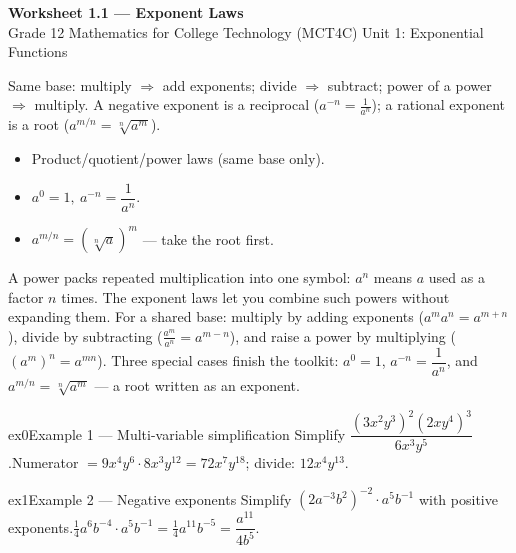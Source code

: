 \documentclass[11pt]{article}
\begin{document}
\begin{center}
{\LARGE\bfseries\color{titleblue}Worksheet 1.1 --- Exponent Laws}\\[2pt]
{\small Grade 12 Mathematics for College Technology (MCT4C) \textperiodcentered{} Unit 1: Exponential Functions}
\end{center}

\begin{ideabox}
Same base: multiply $\Rightarrow$ add exponents; divide $\Rightarrow$ subtract; power of a power $\Rightarrow$ multiply. A negative exponent is a reciprocal ($a^{-n}=\tfrac{1}{a^n}$); a rational exponent is a root ($a^{m/n}=\sqrt[n]{a^m}$).
\begin{itemize}[leftmargin=*,itemsep=2pt]
  \item Product/quotient/power laws (same base only).
  \item $a^{0}=1,\ a^{-n}=\dfrac{1}{a^n}$.
  \item $a^{m/n}=\left(\sqrt[n]{a}\right)^{m}$ — take the root first.
\end{itemize}
\end{ideabox}

\begin{learnbox}
A power packs repeated multiplication into one symbol: $a^n$ means $a$ used as a factor $n$ times. The exponent laws let you combine such powers without expanding them.
For a shared base: multiply by adding exponents ($a^m a^n=a^{m+n}$), divide by subtracting ($\tfrac{a^m}{a^n}=a^{m-n}$), and raise a power by multiplying ($(a^m)^n=a^{mn}$).
Three special cases finish the toolkit: $a^0=1$, $a^{-n}=\dfrac{1}{a^n}$, and $a^{m/n}=\sqrt[n]{a^m}$ — a root written as an exponent.
\end{learnbox}


\begin{example}{ex0}{Example 1 --- Multi-variable simplification}
Simplify $\dfrac{(3x^2y^3)^2(2xy^4)^3}{6x^3y^5}$.\soln Numerator $=9x^4y^6\cdot8x^3y^{12}=72x^7y^{18}$; divide: $12x^4y^{13}$.
\end{example}

\begin{example}{ex1}{Example 2 --- Negative exponents}
Simplify $(2a^{-3}b^2)^{-2}\cdot a^5b^{-1}$ with positive exponents.\soln $\tfrac14a^6b^{-4}\cdot a^5b^{-1}=\tfrac14a^{11}b^{-5}=\dfrac{a^{11}}{4b^5}$.
\end{example}
\end{document}
